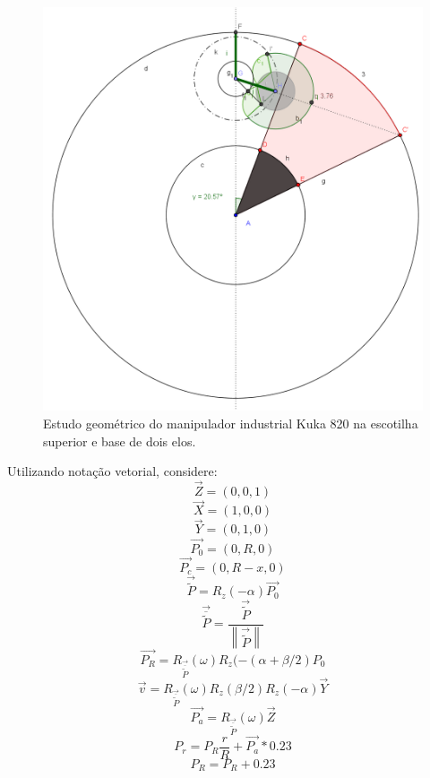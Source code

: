 \begin{figure}[h!]
\centering
	\includegraphics[width=\columnwidth]{figs/estudo/geometrico/kuka.png} 
	\caption{Estudo geométrico do manipulador industrial Kuka 820 na escotilha
	superior e base de dois elos.}
	\label{pakuka}
\end{figure}

Utilizando notação vetorial, considere: 
$$\overrightarrow{Z}=(0,0,1)$$
$$\overrightarrow{X}=(1,0,0) $$
$$\overrightarrow{Y}=(0,1,0)$$
$$\overrightarrow{P_0} = (0,R,0)$$
$$\overrightarrow{P_c}=(0,R-x,0)$$
$$\overrightarrow{\widetilde{P}} = R_z(-\alpha) \overrightarrow{P_0}$$
$$\overrightarrow{\overline{\widetilde{P}}}=\frac{\overrightarrow{\widetilde{P}}}{\left \| \overrightarrow{\widetilde{P}} \right \|}$$
$$\overrightarrow{P_R} =R_{\overrightarrow{\overline{\widetilde{P}}}}(\omega)R_z(-(\alpha+\beta/2)P_0$$
$$\overrightarrow{v}=R_{\overrightarrow{\overline{\widetilde{P}}}}(\omega)R_z(\beta/2)R_z(-\alpha)\overrightarrow{Y}$$
$$\overrightarrow{P_a} =R_{\overrightarrow{\overline{\widetilde{P}}}}(\omega)\overrightarrow{Z}$$
$$P_{r} = P_R\frac{r}{R}+\overrightarrow{P_a}*0.23$$
$$P_R =P_R+0.23 $$

